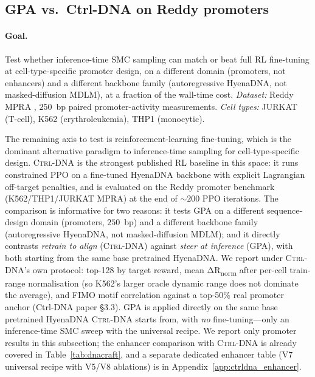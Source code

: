 \documentclass{article}
\theoremstyle{definition}
\theoremstyle{remark}
\newcommand{\gpa}{\textsc{GPA}\xspace}
\newcommand{\ctrldna}{\textsc{Ctrl-DNA}\xspace}
\begin{document}
\subsection{GPA vs.\ Ctrl-DNA on Reddy promoters}\label{sec:results:promoter}

\paragraph{Goal.}
Test whether inference-time SMC sampling can match or beat full RL fine-tuning at cell-type-specific promoter design, on a different domain (promoters, not enhancers) and a different backbone family (autoregressive HyenaDNA, not masked-diffusion MDLM), at a fraction of the wall-time cost. \emph{Dataset:} Reddy MPRA \citep{reddy2020}, $250$~bp paired promoter-activity measurements. \emph{Cell types:} JURKAT (T-cell), K562 (erythroleukemia), THP1 (monocytic).

The remaining axis to test is reinforcement-learning fine-tuning, which is the dominant alternative paradigm to inference-time sampling for cell-type-specific design. \ctrldna{} is the strongest published RL baseline in this space: it runs constrained PPO on a fine-tuned HyenaDNA backbone with explicit Lagrangian off-target penalties, and is evaluated on the Reddy promoter benchmark (K562/THP1/JURKAT MPRA) at the end of $\sim\!200$ PPO iterations. The comparison is informative for two reasons: it tests \gpa{} on a different sequence-design domain (promoters, $250$~bp) and a different backbone family (autoregressive HyenaDNA, not masked-diffusion MDLM); and it directly contrasts \emph{retrain to align} (\ctrldna{}) against \emph{steer at inference} (\gpa{}), with both starting from the same base pretrained HyenaDNA. We report under \ctrldna{}'s own protocol: top-128 by target reward, mean ΔR\textsubscript{norm} after per-cell train-range normalisation (so K562's larger oracle dynamic range does not dominate the average), and FIMO motif correlation against a top-50\% real promoter anchor (Ctrl-DNA paper §3.3). \gpa{} is applied directly on the same base pretrained HyenaDNA \ctrldna{} starts from, with \emph{no} fine-tuning---only an inference-time SMC sweep with the universal recipe. We report only promoter results in this subsection; the enhancer comparison with \ctrldna{} is already covered in Table~\ref{tab:dnacraft}, and a separate dedicated enhancer table (V7 universal recipe with V5/V8 ablations) is in Appendix~\ref{app:ctrldna_enhancer}.
\end{document}
